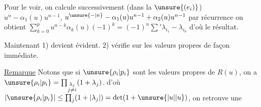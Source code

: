 Pour le voir, on calcule successivement (dans la  $\unsure{(e_i)}$) $u^n-\alpha_1(u)u^{n-1}$, $u^{\unsure{-|n}}-\alpha_1(u)u^{n-1}+\alpha_2(u)u^{n-1}$ par récurrence on obtient $\sum_{k=0}^{p}u^{n-k}\alpha_k(u)(-1)^k=(-1)^n\sum'\lambda_{i_1}-\lambda_{i_k}$ d'où  le résultat.

Maintenant 1) devient évident. 2)  vérifie sur les valeurs propres de façon immédiate.

\uline{Remarque} Notons que si $\unsure{\rho_i|p_i}$ sont les valeurs propres de $R(u)$, on a $\unsure{\rho_i|p_i}=\prod_{\substack{\lambda_j\\j\neq i}}(1+\lambda_j)$. d'où $|\unsure{\rho_i|p_i}|\leq\prod_j(1+|\lambda_j|)=\det(1+\unsure{\lvert u\rvert|u})$, on retrouve une
